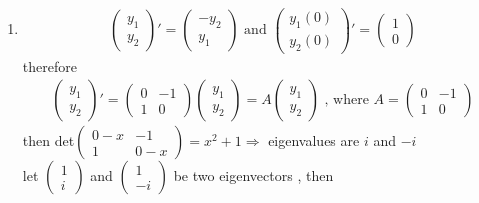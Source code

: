 \documentclass[12pt]{article}
\begin{document}
\begin{enumerate}
		\item %
		\begin{eqnarray*}
			\left( \begin{array}{c}y_1\\y_2\end{array}\right)' 
			=\left( \begin{array}{c}-y_2\\y_1\end{array}\right)
			\text{ and }
			\left(\begin{array}{c}y_1(0)\\y_2(0) \end{array} \right)'	
			=\left(\begin{array}{c}1\\0 \end{array} \right)
		\end{eqnarray*}	
		therefore
		\begin{eqnarray*}
			\left(\begin{array}{c}y_1\\y_2\end{array} \right)'
			=\left(\begin{array}{cc}0&-1\\1&0\end{array} \right)
			\left(\begin{array}{c}y_1\\y_2\end{array} \right)
			=A\left(\begin{array}{c}y_1\\y_2\end{array} \right)
			\text{ , where }
			A = \left(\begin{array}{cc}0&-1\\1&0\end{array} \right)
		\end{eqnarray*}
		then det$\left(\begin{array}{cc}0-x&-1\\1&0-x\end{array} \right)=x^2+1 \Rightarrow$ eigenvalues are $i$ and $-i$\\
		let $\left(\begin{array}{c}1\\i\end{array} \right)$ and $\left(\begin{array}{c}1\\-i\end{array} \right)$ be two eigenvectors , then
		\begin{eqnarray*}

\end{eqnarray*}
\end{enumerate}
\end{document}

